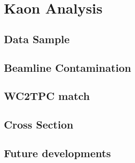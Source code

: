 \chapter{Kaon Analysis}
\section{Data Sample}
\section{Beamline Contamination}
\section{WC2TPC match}
\section{Cross Section}
\section{Future developments}
